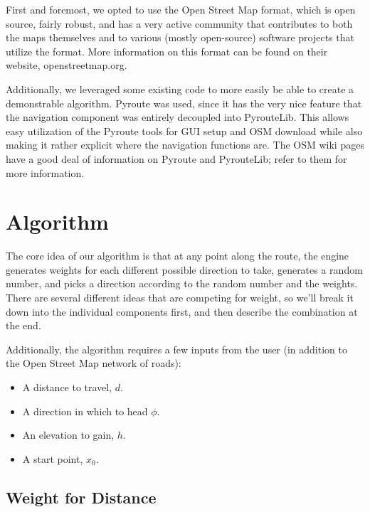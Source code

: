 \documentclass[twocolumn,11pt]{article}
\begin{document}
First and foremost, we opted to use the Open Street Map format, which is open
source, fairly robust, and has a very active community that contributes to both
the maps themselves and to various (mostly open-source) software projects that
utilize the format. More information on this format can be found on their
website, openstreetmap.org.

Additionally, we leveraged some existing code to more easily be able to create
a demonstrable algorithm. Pyroute was used, since it has the very nice feature
that the navigation component was entirely decoupled into PyrouteLib. This
allows easy utilization of the Pyroute tools for GUI setup and OSM download
while also making it rather explicit where the navigation functions are. The
OSM wiki pages have a good deal of information
on Pyroute and PyrouteLib; refer to them for more information.

\section{Algorithm}

The core idea of our algorithm
is that at any point along the route, the engine generates weights for each
different possible direction to take, generates a random number, and picks a
direction according to the random number and the weights. There are several
different ideas that are competing for weight, so we'll break it down into the
individual components first, and then describe the combination at the end.

Additionally, the algorithm requires a few inputs from the user (in addition
to the Open Street Map network of roads):
\begin{itemize}
\item A distance to travel, $d$.
\item A direction in which to head $\phi$.
\item An elevation to gain, $h$.
\item A start point, $x_0$.
\end{itemize}

\subsection{Weight for Distance}
\end{document}
